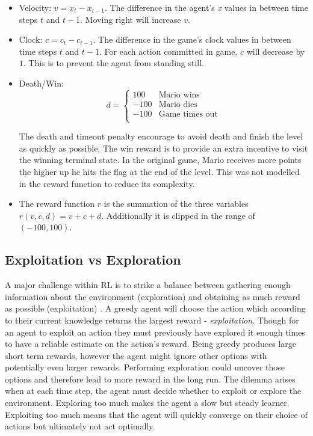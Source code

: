\documentclass[notitlepage,a4paper,11pt]{article}
\begin{document}
\begin{itemize}

	\item Velocity: $v = x_t - x_{t-1}$. The difference in the agent's \textit{x} values in between time steps $t$ and $t - 1$. Moving right will increase $v$.
	
	\item Clock: $c = c_t - c_{t-1}$. The difference in the game's clock values in between time steps $t$ and $t - 1$. For each action committed in game, $c$ will decrease by $1$. This is to prevent the agent from standing still.
	
	\item Death/Win: 
		\begin{equation*}
   	 		d = \begin{cases}
               			100               & \text{Mario wins}\\
               			-100              & \text{Mario dies}\\
               			-100				 & \text{Game times out}\\
           			\end{cases}
		\end{equation*}
		
		The death and timeout penalty encourage to avoid death and finish the level as quickly as possible. The win reward is to provide an extra incentive to visit the winning terminal state. In the original game, Mario receives more points the higher up he hits the flag at the end of the level. This was not modelled in the reward function to reduce its complexity.
		
	\item The reward function $r$ is the summation of the three variables $r(v, c, d) = v + c + d$. Additionally it is clipped in the range of $(-100, 100)$.
	
	
\end{itemize}


\subsection{Exploitation vs Exploration}\label{exploit_explore}
A major challenge within RL is to strike a balance between gathering enough information about the environment (exploration) and obtaining as much reward as possible (exploitation) \cite{sutton2011reinforcement}. A greedy agent will choose the action which according to their current knowledge returns the largest reward - \textit{exploitation}. Though for an agent to exploit an action they must previously have explored it enough times to have a reliable estimate on the action's reward. Being greedy produces large short term rewards, however the agent might ignore other options with potentially even larger rewards. Performing exploration could uncover those options and therefore lead to more reward in the long run. The dilemma arises when at each time step, the agent must decide whether to exploit or explore the environment. Exploring too much makes the agent a slow but steady learner. Exploiting too much means that the agent will quickly converge on their choice of actions but ultimately not act optimally.
\end{document}
